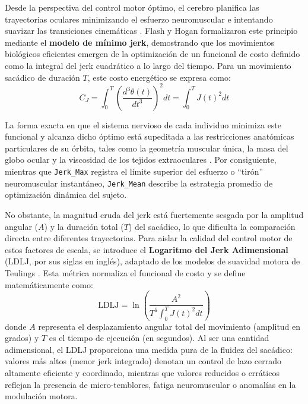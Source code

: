 Desde la perspectiva del control motor óptimo, el cerebro planifica las trayectorias oculares minimizando el esfuerzo neuromuscular e intentando suavizar las transiciones cinemáticas \cite{leigh2015neurology}. Flash y Hogan \cite{flash1985coordination} formalizaron este principio mediante el \textbf{modelo de mínimo jerk}, demostrando que los movimientos biológicos eficientes emergen de la optimización de un funcional de costo definido como la integral del jerk cuadrático a lo largo del tiempo. Para un movimiento sacádico de duración $T$, este costo energético se expresa como:
\begin{equation}
	C_J = \int_{0}^{T} \left( \frac{d^3\theta(t)}{dt^3} \right)^2 dt = \int_{0}^{T} J(t)^2 dt \tag{19}
\end{equation}

La forma exacta en que el sistema nervioso de cada individuo minimiza este funcional y alcanza dicho óptimo está supeditada a las restricciones anatómicas particulares de su órbita, tales como la geometría muscular única, la masa del globo ocular y la viscosidad de los tejidos extraoculares \cite{bahill1975}. Por consiguiente, mientras que \texttt{Jerk\_Max} registra el límite superior del esfuerzo o ``tirón'' neuromuscular instantáneo, \texttt{Jerk\_Mean} describe la estrategia promedio de optimización dinámica del sujeto.

No obstante, la magnitud cruda del jerk está fuertemente sesgada por la amplitud angular ($A$) y la duración total ($T$) del sacádico, lo que dificulta la comparación directa entre diferentes trayectorias. Para aislar la calidad del control motor de estos factores de escala, se introduce el \textbf{Logaritmo del Jerk Adimensional} (LDLJ, por sus siglas en inglés), adaptado de los modelos de suavidad motora de Teulings \cite{teulings1996jerk}. Esta métrica normaliza el funcional de costo y se define matemáticamente como:
\begin{equation}
	\text{LDLJ} = \ln \left( \frac{A^2}{T^5 \int_{0}^{T} J(t)^2 dt} \right) \tag{20}
\end{equation}
donde $A$ representa el desplazamiento angular total del movimiento (amplitud en grados) y $T$ es el tiempo de ejecución (en segundos). Al ser una cantidad adimensional, el LDLJ proporciona una medida pura de la fluidez del sacádico: valores más altos (menor jerk integrado) denotan un control de lazo cerrado altamente eficiente y coordinado, mientras que valores reducidos o erráticos reflejan la presencia de micro-temblores, fatiga neuromuscular o anomalías en la modulación motora.

